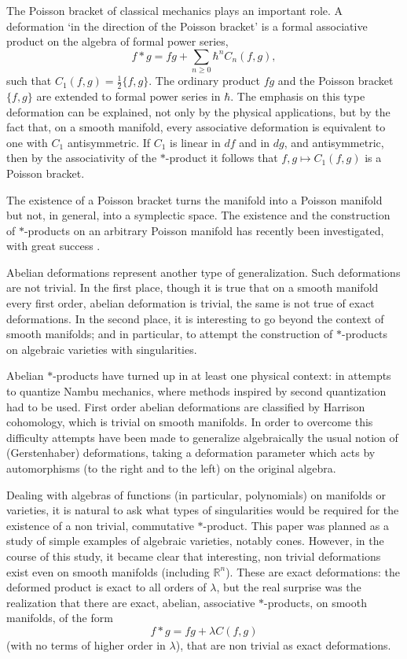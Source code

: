 \documentclass[a4paper,a4paper]{article}
\begin{document}
The Poisson bracket of classical mechanics plays an important role.
A deformation `in the direction of the Poisson bracket' is a formal
associative product on the algebra of formal power series,
$$
f*g = fg + \sum_{n\geq 0}\hbar^nC_n(f,g),
$$
such that $C_1(f,g) = \frac{1}{2}\{f,g\}$. The ordinary product $fg$ and the 
Poisson bracket $\{f,g\}$ are extended to formal power series in $\hbar$.
The emphasis on this type deformation can be explained, not only by the
physical applications, but by the fact that, on a smooth manifold,
every associative deformation is equivalent to one with $C_1$
antisymmetric. If $C_1$ is linear in $df$ and in $dg$,  and
antisymmetric,  then by the associativity of the $*$-product it follows
that $f,g \mapsto C_1(f,g)$ is a Poisson bracket. 

The existence of a Poisson bracket turns the manifold into a Poisson
manifold but not, in general, into a symplectic space. The existence and
the construction of $*$-products on an arbitrary Poisson manifold has
recently been investigated, with great success \cite{K,T}.

Abelian deformations represent another type of generalization. Such
deformations are not trivial. In the first place, though it is true that on a
smooth manifold every first order, abelian deformation is trivial, the
same is not true of exact deformations. In the second place, it is
interesting to go beyond the context of smooth manifolds; and 
in particular, to attempt the construction of
$*$-products on algebraic varieties with singularities.

Abelian $*$-products have turned up in at least one physical context:
in attempts to quantize Nambu mechanics\cite{DFST}, where methods %
inspired by second quantization had to be used. First order abelian 
deformations are classified by Harrison cohomology\cite{B,H}, 
which is trivial on smooth manifolds.
In order to overcome this difficulty attempts have been made \cite{N,P} to
generalize algebraically the usual notion \cite{GS} of (Gerstenhaber) 
deformations, taking a deformation parameter which acts by automorphisms
(to the right and to the left) on the original algebra.

Dealing with algebras of functions (in particular, polynomials)
on manifolds or varieties, %
it is natural to ask what types of singularities would be required for
the existence of a non trivial, commutative $*$-product.  
This paper was planned as a study of simple examples of 
algebraic varieties, notably cones.
However, in the course of this study, it became clear that interesting, 
non trivial deformations exist even on smooth manifolds (including
$\mathbb{R}^n$). These are exact deformations: the deformed product is exact
to all orders of $\lambda$, but the real surprise was the realization that
there are exact, abelian, associative $*$-products, on smooth manifolds, 
of the form
$$
f*g = fg + \lambda C(f,g)
$$ 
(with no terms of higher order in $\lambda$),  that are non trivial
as exact deformations.
\end{document}
